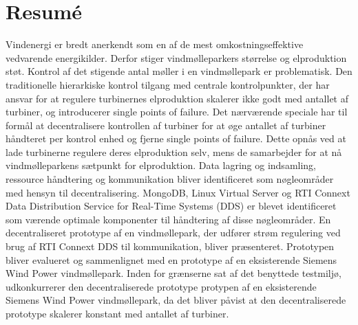 \chapter{Resumé}
Vindenergi er bredt anerkendt som en af de mest omkostningseffektive vedvarende energikilder.
Derfor stiger vindmølleparkers størrelse og elproduktion støt.
Kontrol af det stigende antal møller i en vindmøllepark er problematisk.
Den traditionelle hierarkiske kontrol tilgang med centrale kontrolpunkter, der har ansvar for at regulere turbinernes elproduktion skalerer ikke godt med antallet af turbiner, og introducerer single points of failure.
Det nærværende speciale har til formål at decentralisere kontrollen af turbiner for at øge antallet af turbiner håndteret per kontrol enhed og fjerne single points of failure.
Dette opnås ved at lade turbinerne regulere deres elproduktion selv, mens de samarbejder for at nå vindmølleparkens sætpunkt for elproduktion.
Data lagring og indsamling, ressource håndtering og kommunikation bliver identificeret som nøgleområder med hensyn til decentralisering.  
MongoDB, Linux Virtual Server og RTI Connext Data Distribution Service for Real-Time Systems (DDS) er blevet identificeret som værende optimale komponenter til håndtering af disse nøgleområder.
En decentraliseret prototype af en vindmøllepark, der udfører strøm regulering ved brug af RTI Connext DDS til kommunikation, bliver præsenteret. 
Prototypen bliver evalueret og sammenlignet med en prototype af en eksisterende Siemens Wind Power vindmøllepark. 
Inden for grænserne sat af det benyttede testmiljø, udkonkurrerer den decentraliserede prototype protypen af en eksisterende Siemens Wind Power vindmøllepark, da det bliver påvist at den decentraliserede prototype skalerer konstant med antallet af turbiner.
